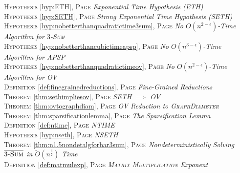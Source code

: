 
\begin{multicols}{2}
      \setlength{\parindent}{0pt}
      \footnotesize{

\textsc{Hypothesis} \ref{hyp:ETH}, \textsc{Page} \pageref{hyp:ETH} \textit{\cite {impagliazzo2001ksatcomplexity} Exponential Time Hypothesis (ETH)} \\
\textsc{Hypothesis} \ref{hyp:SETH}, \textsc{Page} \pageref{hyp:SETH} \textit{\cite {impagliazzo2001ksatcomplexity,impagliazzo2001stronglyexp} Strong Exponential Time Hypothesis (SETH)} \\
\textsc{Hypothesis} \ref{hyp:nobetterthanquadratictime3sum}, \textsc{Page} \pageref{hyp:nobetterthanquadratictime3sum} \textit{No \(O(n^{2-\epsilon })\)-Time Algorithm for \(3\)-\textsc {Sum}} \\
\textsc{Hypothesis} \ref{hyp:nobetterthancubictimeapsp}, \textsc{Page} \pageref{hyp:nobetterthancubictimeapsp} \textit{No \(O(n^{3-\epsilon })\)-Time Algorithm for \textsc {APSP}} \\
\textsc{Hypothesis} \ref{hyp:nobetterthanquadratictimeov}, \textsc{Page} \pageref{hyp:nobetterthanquadratictimeov} \textit{No \(O(n^{2-\epsilon })\)-Time Algorithm for \textsc {OV}} \\
\textsc{Definition} \ref{def:finegrainedreductions}, \textsc{Page} \pageref{def:finegrainedreductions} \textit{\cite {williams2019finegrained} Fine-Grained Reductions} \\
\textsc{Theorem} \ref{thm:sethimpliesov}, \textsc{Page} \pageref{thm:sethimpliesov} \textit{\cite {williams2005twoconstraintsat} SETH \(\implies \) OV} \\
\textsc{Theorem} \ref{thm:ovtographdiam}, \textsc{Page} \pageref{thm:ovtographdiam} \textit{\cite {roditty2013fast} \textsc {OV} Reduction to \textsc {GraphDiameter}} \\
\textsc{Theorem} \ref{thm:sparsificationlemma}, \textsc{Page} \pageref{thm:sparsificationlemma} \textit{The Sparsification Lemma} \\
\textsc{Definition} \ref{def:ntime}, \textsc{Page} \pageref{def:ntime} \textit{NTIME} \\
\textsc{Hypothesis} \ref{hyp:nseth}, \textsc{Page} \pageref{hyp:nseth} \textit{NSETH} \\
\textsc{Theorem} \ref{thm:n1.5nondetalgforbar3sum}, \textsc{Page} \pageref{thm:n1.5nondetalgforbar3sum} \textit{\cite {carmosino2016nseth} Nondeterministically Solving \(\bar {3\textsc {-Sum}}\) in \(\tilde {O}(n^{\frac {3}{2}})\) Time} \\
\textsc{Definition} \ref{def:matmulexp}, \textsc{Page} \pageref{def:matmulexp} \textit{\textsc {Matrix Multiplication} Exponent} \\
}
\end{multicols}
